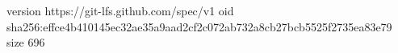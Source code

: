 version https://git-lfs.github.com/spec/v1
oid sha256:effce4b410145ec32ae35a9aad2cf2c072ab732a8cb27bcb5525f2735ea83e79
size 696

